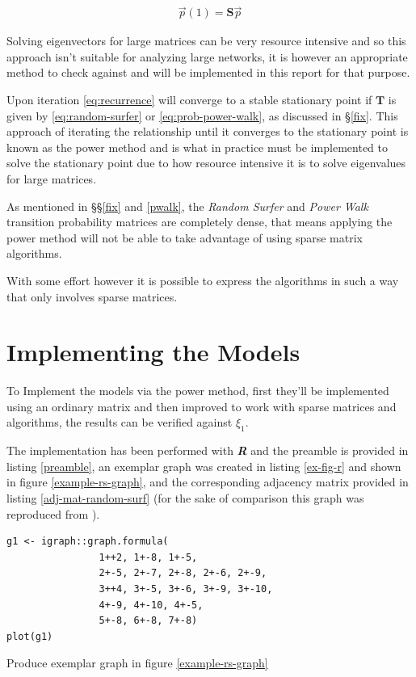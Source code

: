 \documentclass[11pt]{report}
\begin{document}
\begin{align}
\vec{p} (1) = \mathbf{S} \vec{p} \label{eq:eigenprob}
\end{align}

Solving eigenvectors for large matrices can be very resource intensive and so
this approach isn't suitable for analyzing large networks, it is however an appropriate method to check against and will be implemented in this report for that purpose.

Upon iteration \eqref{eq:recurrence}  will converge to a stable stationary point if \(\mathbf{T}\) is given by \eqref{eq:random-surfer} or \eqref{eq:prob-power-walk}, as discussed
in \S \ref{fix}. This approach of iterating the relationship until it converges to the stationary point is known as the power method
\cite{larsonElementaryLinearAlgebra1991a} and is what in practice must be
implemented to solve the stationary point due to how resource intensive it is to solve eigenvalues for large matrices.

As mentioned in \S\S \ref{fix} and \ref{pwalk}, the \emph{Random Surfer} and \emph{Power Walk}
transition probability matrices are completely dense, that means applying the
power method will not be able to take advantage of using sparse matrix
algorithms.

With some effort however it is possible to express the algorithms in such a way that only involves sparse matrices.

\section{Implementing the Models}
\label{implement_models}
To Implement the models via the power method, first they'll be implemented using
an ordinary matrix and then improved to work with sparse matrices and
algorithms, the results can be verified against \(\xi_{1}\).

The implementation has been performed with \emph{\textbf{R}} and the preamble is
provided in listing \ref{preamble}, an exemplar graph was created in listing \ref{ex-fig-r} and shown in figure \ref{example-rs-graph}, and the corresponding adjacency matrix provided in listing \ref{adj-mat-random-surf} (for the sake of comparison this graph was reproduced from \cite{parkPowerWalkRevisiting2013}).




\begin{listing}[htbp]
\begin{tcolorbox}
\begin{verbatim}
g1 <- igraph::graph.formula(
                1++2, 1+-8, 1+-5,
                2+-5, 2+-7, 2+-8, 2+-6, 2+-9,
                3++4, 3+-5, 3+-6, 3+-9, 3+-10,
                4+-9, 4+-10, 4+-5,
                5+-8, 6+-8, 7+-8)
plot(g1)
\end{verbatim}
\caption{\label{ex-fig-r}Produce exemplar graph in figure \ref{example-rs-graph}}
\end{tcolorbox}
\end{listing}
\end{document}
